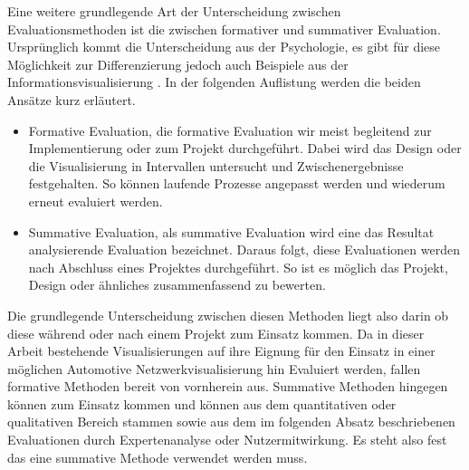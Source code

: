 \documentclass[draft=false
              ,paper=a4
              ,twoside=false
              ,fontsize=11pt
              ,headsepline
              ,BCOR10mm
              ,DIV11
              ]{scrbook}
\begin{document}
Eine weitere grundlegende Art der Unterscheidung zwischen Evaluationsmethoden ist die zwischen formativer und summativer Evaluation. Ursprünglich kommt die Unterscheidung aus der Psychologie, es gibt für diese Möglichkeit zur Differenzierung jedoch auch Beispiele aus der Informationsvisualisierung \cite{andrews_evaluating_2006}. In der folgenden Auflistung werden die beiden Ansätze kurz erläutert.
\begin{itemize}
  \item Formative Evaluation, die formative Evaluation wir meist begleitend zur Implementierung oder zum Projekt durchgeführt. Dabei wird das Design oder die Visualisierung in Intervallen untersucht und Zwischenergebnisse festgehalten. So können laufende Prozesse angepasst werden und wiederum erneut evaluiert werden.
  \item Summative Evaluation, als summative Evaluation wird eine das Resultat analysierende Evaluation bezeichnet. Daraus folgt, diese Evaluationen werden nach Abschluss eines Projektes durchgeführt. So ist es möglich das Projekt, Design oder ähnliches zusammenfassend zu bewerten.
\end{itemize}
Die grundlegende Unterscheidung zwischen diesen Methoden liegt also darin ob diese während oder nach einem Projekt zum Einsatz kommen.  Da in dieser Arbeit bestehende Visualisierungen auf ihre Eignung für den Einsatz in einer möglichen Automotive Netzwerkvisualisierung hin Evaluiert werden, fallen formative Methoden bereit von vornherein aus. Summative Methoden hingegen können zum Einsatz kommen und können aus dem quantitativen oder qualitativen Bereich stammen sowie aus dem im folgenden Absatz beschriebenen Evaluationen durch Expertenanalyse oder Nutzermitwirkung. Es steht also fest das eine summative Methode verwendet werden muss.
\end{document}
